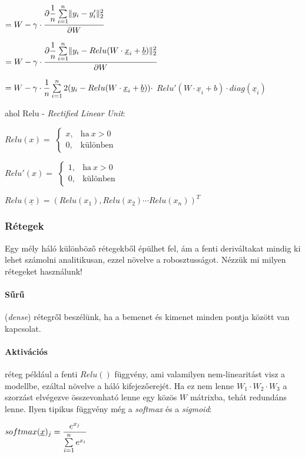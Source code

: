 $ = W - \gamma \cdot  \dfrac{\partial { \dfrac{1}{n} \sum\limits_{{i}=1}^{n} \lVert y_i-y_i'\rVert_2^2}}{\partial {W}} $


$ = W - \gamma \cdot \dfrac{\partial { \dfrac{1}{n} \sum\limits_{{i}=1}^{n} \lVert y_i-Relu(W \cdot \underline{x}_i + \underline{b})\rVert_2^2}}{\partial {W}} $

$ = W - \gamma \cdot \dfrac{1}{n} \sum\limits_{{i}=1}^{n} 2 (y_i-Relu(W \cdot \underline{x}_i + \underline{b})) \cdot   $
$ Relu'(W \cdot \underline{x}_i + b) \cdot  diag(\underline{x}_i) $


\noindent
ahol Relu - \textit{Rectified Linear Unit}:


$ Relu(x) =  $
$ \begin{cases}
x, & \text{ha}\ x > 0 \\
0, & \text{különben}
\end{cases} $

$ Relu'(x) =  $
$ \begin{cases}
1, & \text{ha}\ x > 0 \\
0, & \text{különben}
\end{cases} $

$ Relu(\underline{x}) = (Relu(x_1), Relu(x_2) \cdots Relu(x_n))^T $



\subsubsection{Rétegek}


Egy mély háló különböző rétegekből épülhet fel, ám a fenti deriváltakat
mindig ki lehet számolni analitikusan, ezzel növelve a robosztusságot.
Nézzük mi milyen rétegeket használunk!

\paragraph{Sűrű} (\textit{dense}) rétegről beszélünk, ha a bemenet és kimenet 
minden pontja között van kapcsolat.

\paragraph{Aktivációs} réteg például a fenti $ Relu() $ függvény, ami 
valamilyen nem-linearitást visz a modellbe, ezáltal növelve a háló 
kifejezőerejét. Ha ez nem lenne $ W_1 \cdot W_2 \cdot W_3 $ a szorzást 
elvégezve összevonható lenne egy közös $ W $ mátrixba, tehát redundáns 
lenne. Ilyen tipikus függvény még a \textit{softmax} és a \textit{sigmoid}:

$ softmax(\underline{x})_j = \dfrac{e^{x_j}}{\sum\limits_{{i}=1}^{n}e^{x_i}} $


